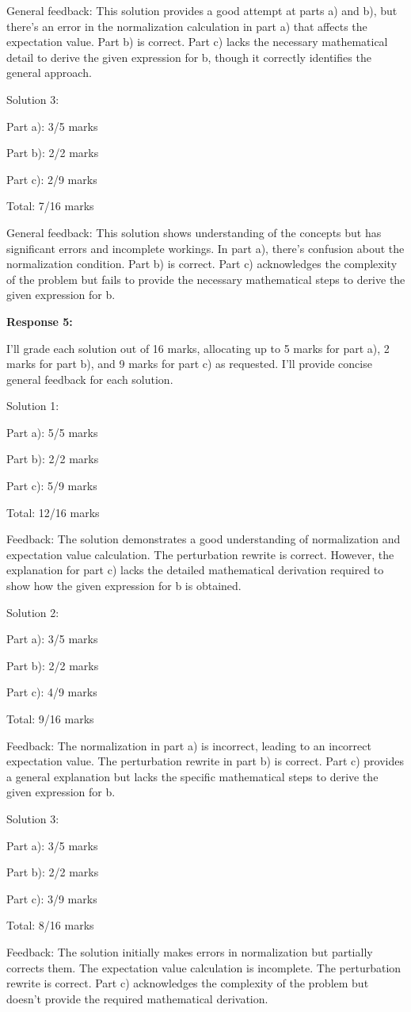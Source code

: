 \documentclass[a4paper,11pt]{article}
\begin{document}
General feedback: This solution provides a good attempt at parts a) and b), but there's an error in the normalization calculation in part a) that affects the expectation value. Part b) is correct. Part c) lacks the necessary mathematical detail to derive the given expression for b, though it correctly identifies the general approach.

Solution 3:

Part a): 3/5 marks

Part b): 2/2 marks

Part c): 2/9 marks

Total: 7/16 marks

General feedback: This solution shows understanding of the concepts but has significant errors and incomplete workings. In part a), there's confusion about the normalization condition. Part b) is correct. Part c) acknowledges the complexity of the problem but fails to provide the necessary mathematical steps to derive the given expression for b.

\bigskip
\textbf{Response 5:}

I'll grade each solution out of 16 marks, allocating up to 5 marks for part a), 2 marks for part b), and 9 marks for part c) as requested. I'll provide concise general feedback for each solution.

Solution 1:

Part a): 5/5 marks

Part b): 2/2 marks

Part c): 5/9 marks

Total: 12/16 marks

Feedback: The solution demonstrates a good understanding of normalization and expectation value calculation. The perturbation rewrite is correct. However, the explanation for part c) lacks the detailed mathematical derivation required to show how the given expression for b is obtained.

Solution 2:

Part a): 3/5 marks

Part b): 2/2 marks

Part c): 4/9 marks

Total: 9/16 marks

Feedback: The normalization in part a) is incorrect, leading to an incorrect expectation value. The perturbation rewrite in part b) is correct. Part c) provides a general explanation but lacks the specific mathematical steps to derive the given expression for b.

Solution 3:

Part a): 3/5 marks

Part b): 2/2 marks

Part c): 3/9 marks

Total: 8/16 marks

Feedback: The solution initially makes errors in normalization but partially corrects them. The expectation value calculation is incomplete. The perturbation rewrite is correct. Part c) acknowledges the complexity of the problem but doesn't provide the required mathematical derivation.
\end{document}
